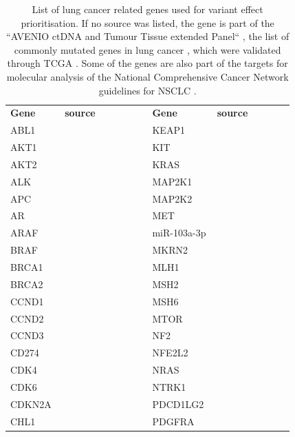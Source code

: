 \begin{table}
\centering
\caption[Lung cancer genes for CASCADE analysis]{List of lung cancer related genes used for variant effect prioritisation. If no source was listed, the gene is part of the ``AVENIO ctDNA and Tumour Tissue extended Panel`` \protect\cite{RSS2018}, the list of commonly mutated genes in lung cancer \protect\cite{Greulich2010,ElTelbany2012}, which were validated through TCGA \protect\cite{CGARN2014}. Some of the genes are also part of the targets for molecular analysis of the National Comprehensive Cancer Network guidelines for NSCLC \protect\cite{NCCN2022}.}\label{A:cas:tab:lungcancergenes}
\footnotesize
\centering
{}
\vspace{-0.5em}
\begin{tabular}{|C{0.15\linewidth} | C{0.25\linewidth} | C{0.02\linewidth} | C{0.15\linewidth} | C{0.25\linewidth}|}
\toprule
 \hhline{|-|-|~|-|-|}
 \textbf{Gene} & \textbf{source} &  & \textbf{Gene} & \textbf{source}\\
 \hhline{|-|-|~|-|-|}
 ABL1 & &  & KEAP1 & \\
 AKT1 & &  & KIT & \\
 AKT2 & &  & KRAS & \\
 ALK & &  & MAP2K1 & \\
 APC & &  & MAP2K2 & \\
 AR & &  & MET & \\
 ARAF & &  & miR-103a-3p & \textcite{Fan2018} \\
 BRAF & &  & MKRN2 & \textcite{Jiang2018c} \\
 BRCA1 & &  & MLH1 & \\
 BRCA2 & &  & MSH2 & \\
 CCND1 & &  & MSH6 & \\
 CCND2 & &  & MTOR & \\
 CCND3 & &  & NF2 & \\
 CD274 & &  & NFE2L2 & \\
 CDK4 & &  & NRAS & \\
 CDK6 & &  & NTRK1 & \\
 CDKN2A & &  & PDCD1LG2 & \\
 CHL1 & \textcite{Hoetzel2019} &  & PDGFRA & \\

\end{tabular}
\end{table}

